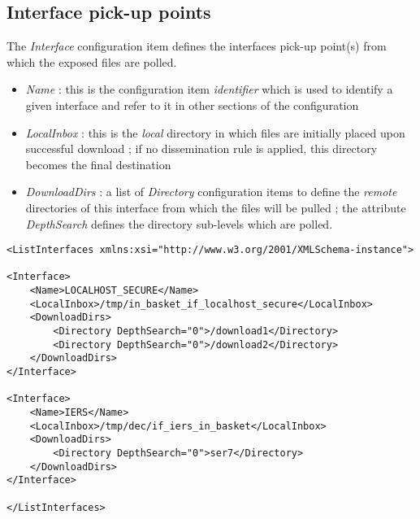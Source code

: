 \documentclass[dec_sum_main.tex]{subfiles}
\begin{document}
\subsection{Interface pick-up points}
The \textit{Interface} configuration item defines the interfaces pick-up point(s) from which the exposed files are polled.
\par
\noindent
\label{LocalInbox}
\begin{itemize}
	\item \textit{Name} : this is the configuration item \textit{identifier} which is used to identify a given interface and refer to it in other sections of the configuration
	\item \textit{LocalInbox} : this is the \textit{local} directory in which files are initially placed upon successful download ; if no dissemination rule is applied, this directory becomes the final destination  
	\item \textit{DownloadDirs} : a list of \textit{Directory} configuration items to define the \textit{remote} directories of this interface from which the files will be pulled ; the attribute \textit{DepthSearch} defines the directory sub-levels which are polled.
\end{itemize}


\begin{lstlisting}
<ListInterfaces xmlns:xsi="http://www.w3.org/2001/XMLSchema-instance">

<Interface>
	<Name>LOCALHOST_SECURE</Name>
	<LocalInbox>/tmp/in_basket_if_localhost_secure</LocalInbox>
	<DownloadDirs>
		<Directory DepthSearch="0">/download1</Directory>
		<Directory DepthSearch="0">/download2</Directory>
	</DownloadDirs>
</Interface>
				
<Interface>
	<Name>IERS</Name>
	<LocalInbox>/tmp/dec/if_iers_in_basket</LocalInbox>
	<DownloadDirs>
		<Directory DepthSearch="0">ser7</Directory>
	</DownloadDirs>
</Interface>
		
</ListInterfaces>
\end{lstlisting}

\par
\noindent
	
\end{document}
